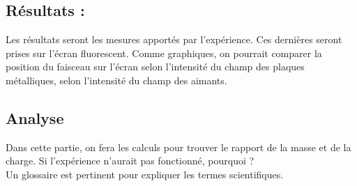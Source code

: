 \documentclass[../main.tex]{subfiles}
\begin{document}
\subsection{Résultats :}
Les résultats seront les mesures apportés par l'expérience. Ces dernières seront prises sur l'écran fluorescent. Comme graphiques, on pourrait comparer la position du faisceau sur l'écran selon l'intensité du champ des plaques métalliques, selon l'intensité du champ des aimants.
\subsection{Analyse}
Dans cette partie, on fera les calculs pour trouver le rapport de la masse et de la charge. Si l'expérience n'aurait pas fonctionné, pourquoi ?\\
\vspace{2cm}
Un glossaire est pertinent pour expliquer les termes scientifiques.
\end{document}
